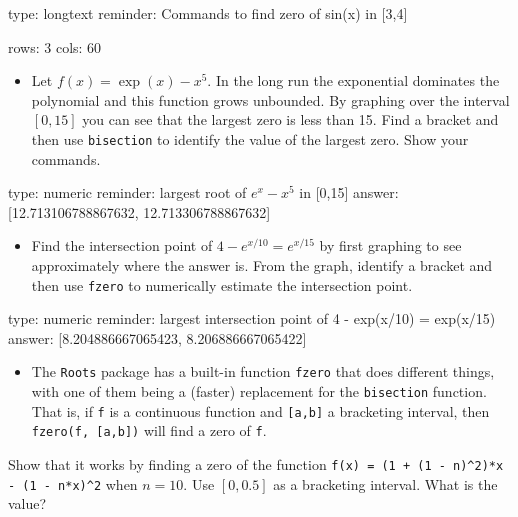 \documentclass[12pt]{article}
\begin{document}
\begin{answer}
type: longtext
reminder: Commands to find zero of sin(x) in [3,4]

rows: 3
cols: 60
\end{answer}

\begin{itemize}
\itemsep1pt\parskip0pt
\item
  Let $f(x) = \exp(x) - x^5$. In the long run the exponential dominates
  the polynomial and this function grows unbounded. By graphing over the
  interval $[0,15]$ you can see that the largest zero is less than 15.
  Find a bracket and then use \texttt{bisection} to identify the value
  of the largest zero. Show your commands.
\end{itemize}

\begin{answer}
    type: numeric
    reminder: largest root of \( e^x - x^5 \) in [0,15]
    answer: [12.713106788867632, 12.713306788867632]

\end{answer}

\begin{itemize}
\itemsep1pt\parskip0pt
\item
  Find the intersection point of $4 - e^{x/10} = e^{x/15}$ by first
  graphing to see approximately where the answer is. From the graph,
  identify a bracket and then use \texttt{fzero} to numerically estimate
  the intersection point.
\end{itemize}

\begin{answer}
    type: numeric
    reminder: largest intersection point of  4 - exp(x/10) = exp(x/15)
    answer: [8.204886667065423, 8.206886667065422]

\end{answer}

\begin{itemize}
\itemsep1pt\parskip0pt
\item
  The \texttt{Roots} package has a built-in function \texttt{fzero} that
  does different things, with one of them being a (faster) replacement
  for the \texttt{bisection} function. That is, if \texttt{f} is a
  continuous function and \texttt{{[}a,b{]}} a bracketing interval, then
  \texttt{fzero(f, {[}a,b{]})} will find a zero of \texttt{f}.
\end{itemize}

Show that it works by finding a zero of the function
\texttt{f(x) = (1 + (1 - n)\^{}2)*x - (1 - n*x)\^{}2} when $n=10$. Use
$[0, 0.5]$ as a bracketing interval. What is the value?
\end{document}
